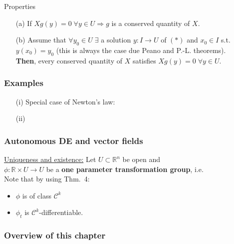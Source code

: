 \documentclass[10pt]{beamer}
\newcommand{\R}{\mathbb{R}}
\begin{document}
{\begin{frame}
\begin{block}{Properties}
\begin{itemize}
\item[(a)] If $Xg(y)=0 \;\forall y \in U \Rightarrow g$ is a conserved quantity of $X$.
\item[(b)] Assume that $\forall y_0 \in U\; \exists$ a solution $y: I \rightarrow U$ of $(*)$ and $x_0 \in I$ s.t. $y(x_0)=y_0$ (this is always the case due Peano and P.-L. theorems).\\
\textbf{Then},  every conserved quantity of $X$ satisfies $Xg(y)=0\; \forall y \in U$.
\end{itemize}
\end{block}
\end{frame}

\begin{frame}\frametitle{Examples}
\begin{itemize}
\item[(i)] Special case of Newton's law:\\
\vspace{3cm}
\item[(ii)] \; \vspace{2cm}
\end{itemize}
\end{frame}

\begin{frame}\frametitle{Autonomous DE and vector fields}
\underline{Uniqueness and existence:}
Let $U \subset \R^n$ be open and\\
\vspace{0.2cm}
$\phi: \R \times U \rightarrow U$ be a \textbf{one parameter transformation group}, i.e. \\
\vspace{5cm}
Note that by using Thm.~4: \begin{itemize}
\item $\phi$ is of class $\mathcal{C}^k$
\item $\phi_t$ is $\mathcal{C}^k$-differentiable.
\end{itemize}
\end{frame}


\begin{frame}\frametitle{Overview of this chapter}

\end{frame}

}
\end{document}

